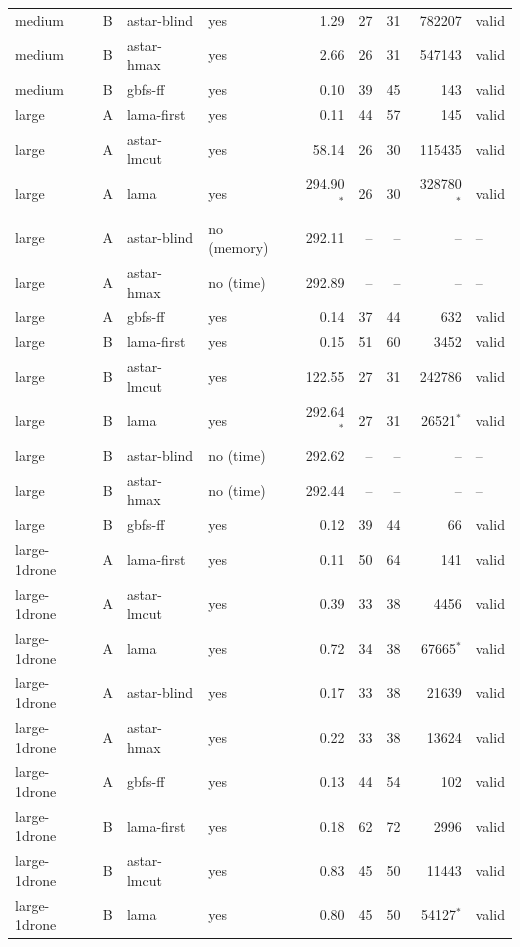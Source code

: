\documentclass[11pt,a4paper]{article}
\begin{document}
\begin{table}[p]
\begin{tabular}{@{}l c l l r r r r l@{}}
    medium & B & astar-blind & yes & 1.29 & 27 & 31 & 782207 & valid \\
    medium & B & astar-hmax & yes & 2.66 & 26 & 31 & 547143 & valid \\
    medium & B & gbfs-ff & yes & 0.10 & 39 & 45 & 143 & valid \\
    \midrule
    large & A & lama-first & yes & 0.11 & 44 & 57 & 145 & valid \\
    large & A & astar-lmcut & yes & 58.14 & 26 & 30 & 115435 & valid \\
    large & A & lama & yes & 294.90$^*$ & 26 & 30 & 328780$^*$ & valid \\
    large & A & astar-blind & no (memory) & 292.11 & -- & -- & -- & -- \\
    large & A & astar-hmax & no (time) & 292.89 & -- & -- & -- & -- \\
    large & A & gbfs-ff & yes & 0.14 & 37 & 44 & 632 & valid \\
    large & B & lama-first & yes & 0.15 & 51 & 60 & 3452 & valid \\
    large & B & astar-lmcut & yes & 122.55 & 27 & 31 & 242786 & valid \\
    large & B & lama & yes & 292.64$^*$ & 27 & 31 & 26521$^*$ & valid \\
    large & B & astar-blind & no (time) & 292.62 & -- & -- & -- & -- \\
    large & B & astar-hmax & no (time) & 292.44 & -- & -- & -- & -- \\
    large & B & gbfs-ff & yes & 0.12 & 39 & 44 & 66 & valid \\
    \midrule
    large-1drone & A & lama-first & yes & 0.11 & 50 & 64 & 141 & valid \\
    large-1drone & A & astar-lmcut & yes & 0.39 & 33 & 38 & 4456 & valid \\
    large-1drone & A & lama & yes & 0.72 & 34 & 38 & 67665$^*$ & valid \\
    large-1drone & A & astar-blind & yes & 0.17 & 33 & 38 & 21639 & valid \\
    large-1drone & A & astar-hmax & yes & 0.22 & 33 & 38 & 13624 & valid \\
    large-1drone & A & gbfs-ff & yes & 0.13 & 44 & 54 & 102 & valid \\
    large-1drone & B & lama-first & yes & 0.18 & 62 & 72 & 2996 & valid \\
    large-1drone & B & astar-lmcut & yes & 0.83 & 45 & 50 & 11443 & valid \\
    large-1drone & B & lama & yes & 0.80 & 45 & 50 & 54127$^*$ & valid \\

\end{tabular}
\end{table}
\end{document}
